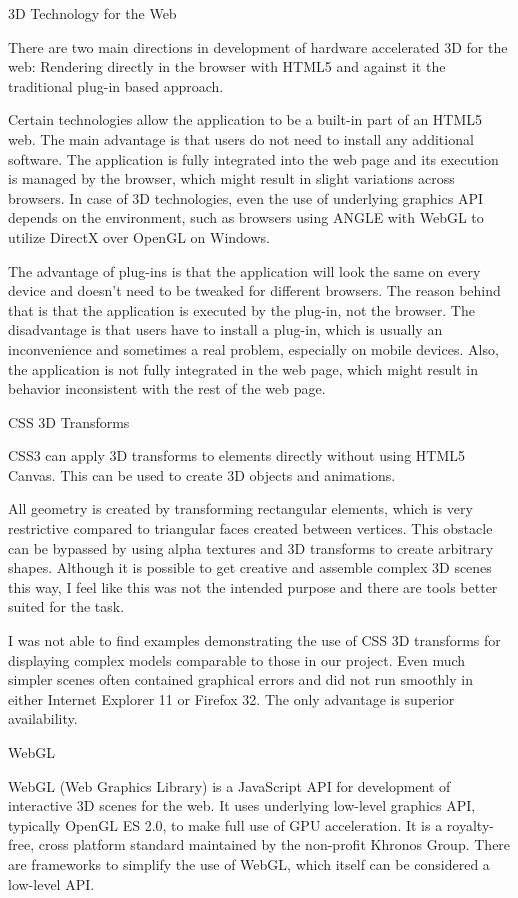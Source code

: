 \sec 3D Technology for the Web

There are two main directions in development of hardware accelerated 3D for the web: Rendering directly in the browser with HTML5 and against it the traditional plug-in based approach.

Certain technologies allow the application to be a built-in part of an HTML5 web. The main advantage is that users do not need to install any additional software. The application is fully integrated into the web page and its execution is managed by the browser, which might result in slight variations across browsers. In case of 3D technologies, even the use of underlying graphics API depends on the environment, such as browsers using ANGLE with WebGL to utilize DirectX over OpenGL on Windows.

The advantage of plug-ins is that the application will look the same on every device and doesn’t need to be tweaked for different browsers. The reason behind that is that the application is executed by the plug-in, not the browser. The disadvantage is that users have to install a plug-in, which is usually an inconvenience and sometimes a real problem, especially on mobile devices. Also, the application is not fully integrated in the web page, which might result in behavior inconsistent with the rest of the web page.

\secc CSS 3D Transforms

CSS3 can apply 3D transforms to elements directly without using HTML5 Canvas. This can be used to create 3D objects and animations.

All geometry is created by transforming rectangular elements, which is very restrictive compared to triangular faces created between vertices. This obstacle can be bypassed by using alpha textures and 3D transforms to create arbitrary shapes. Although it is possible to get creative and assemble complex 3D scenes this way, I feel like this was not the intended purpose and there are tools better suited for the task.

I was not able to find examples demonstrating the use of CSS 3D transforms for displaying complex models comparable to those in our project. Even much simpler scenes often contained graphical errors and did not run smoothly in either Internet Explorer 11 or Firefox 32. The only advantage is superior availability.

\secc WebGL

WebGL (Web Graphics Library) is a JavaScript API for development of interactive 3D scenes for the web. It uses underlying low-level graphics API, typically OpenGL ES 2.0, to make full use of GPU acceleration.  It is a royalty-free, cross platform standard maintained by the non-profit Khronos Group. There are frameworks to simplify the use of WebGL, which itself can be considered a low-level API.

